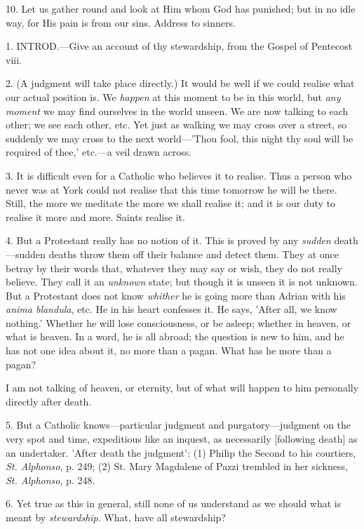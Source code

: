 10. Let us gather round and look at Him whom God
has punished; but in no idle way, for His pain is from our sins.
Address to sinners.


1. INTROD.—Give
an account of thy stewardship, from the Gospel of Pentecost viii.

2. (A judgment will take place directly.) It
would be well if we could realise what our actual position is. We \emph{happen}
at this moment to be in this world, but \emph{any moment} we may find
ourselves in the world unseen. We are now talking to each other; we
see each other, etc. Yet just as walking we may cross over a street,
so suddenly we may cross to the next world—'Thou fool, this night
thy soul will be required of thee,' etc.—a veil drawn across.

3. It is difficult even for a Catholic who
believes it to realise. Thus a person who never was at York could not
realise that this time tomorrow he will be there. Still, the more we
meditate the more we shall realise it; and it is our duty to realise
it more and more. Saints realise it.

4. But a Protestant really has no notion of it.
This is proved by any \emph{sudden} death—sudden deaths throw
them off their balance and detect them. They at once betray by their
words that, whatever they may say or wish, they do not really believe.
They call it an \emph{unknown} state; but though it is unseen it is
not unknown. But a Protestant does not know \emph{whither} he is going
more than Adrian with his \emph{anima blandula}, etc. He in his heart
confesses it. He says, 'After all, we know nothing.' Whether he will
lose consciousness, or be asleep; whether in heaven, or what is
heaven. In a word, he is all abroad; the question is new to him, and
he has not one idea about it, no more than a pagan. What has he more
than a pagan?

I am not talking of heaven, or eternity, but of
what will happen to him personally directly after death.

5. But a Catholic knows—particular judgment and
purgatory—judgment on the very spot and time, expeditious like an
inquest, as necessarily [following death] as an undertaker. 'After
death the judgment': (1) Philip the Second to his courtiers, \emph{St.
Alphonso}, p. 249; (2) St. Mary Magdalene of Pazzi trembled in her
sickness, \emph{St. Alphonso}, p. 248.

6. Yet true as this in general, still none of us
understand as we should what is meant by \emph{stewardship}. What,
have all stewardship?

